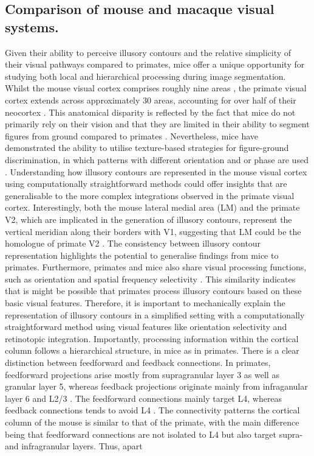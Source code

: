 \documentclass[12pt]{article}
\begin{document}
\subsection{Comparison of mouse and macaque visual systems.}
Given their ability to perceive illusory contours and the relative simplicity of their visual pathways compared to primates, mice offer a unique opportunity for studying both local and hierarchical processing during image segmentation. Whilst the mouse visual cortex comprises roughly nine areas \autocite{wangAreaMapMouse2007}, the primate visual cortex extends across approximately 30 areas, accounting for over half of their neocortex \autocite{fellemanDistributedHierarchicalProcessing1991}. This anatomical disparity is reflected by the fact that mice do not primarily rely on their vision and that they are limited in their ability to segment figures from ground compared to primates \autocite{luongoMicePrimatesUse2023}. Nevertheless, mice have demonstrated the ability to utilise texture-based strategies for figure-ground discrimination, in which patterns with different orientation and or phase are used \autocite{kirchbergerEssentialRoleFeedback2020}. Understanding how illusory contours are represented in the mouse visual cortex using computationally straightforward methods could offer insights that are generalisable to the more complex integrations observed in the primate visual cortex. Interestingly, both the mouse lateral medial area (LM) and the primate V2, which are implicated in the generation of illusory contours, represent the vertical meridian along their borders with V1, suggesting that LM could be the homologue of primate V2 \autocite{gamanutAnatomicalFunctionalConnectomes2022}. The consistency between illusory contour representation highlights the potential to generalise findings from mice to primates. Furthermore, primates and mice also share visual processing functions, such as orientation and spatial frequency selectivity \autocite{niellHighlySelectiveReceptive2008}. This similarity indicates that is might be possible that primates process illusory contours based on these basic visual features. Therefore, it is important to mechanically explain the representation of illusory contours in a simplified setting with a computationally straightforward method using visual features like orientation selectivity and retinotopic integration. Importantly, processing information within the cortical column follows a hierarchical structure, in mice as in primates. There is a clear distinction between feedforward and feedback connections. In primates, feedforward projections arise mostly from supragranular layer 3 as well as granular layer 5, whereas feedback projections originate mainly from infraganular layer 6 and L2/3 \autocite{markovAnatomyHierarchyFeedforward2014}. The feedforward connections mainly target L4, whereas feedback connections tends to avoid L4 \autocite{rocklandWhatWeKnow2019}. The connectivity patterns the cortical column of the mouse is similar to that of the primate, with the main difference being that feedforward connections are not isolated to L4 but also target supra- and infragranular layers. Thus, apart 
\end{document}
